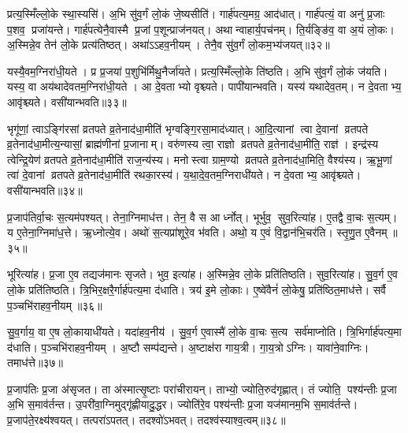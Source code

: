 प्रत्य॒स्मिँल्लो॒के स्था॒स्यसि॑।
अ॒भि सु॑व॒र्गं लो॒कं जे॒ष्यसीति॑।
गार्\mbox{}ह॑पत्य॒मग्र॒ आद॑धात्।
गार्\mbox{}ह॑पत्यं॒ वा अनु॑ प्र॒जाः प॒शव॒ प्रजा॑यन्ते।
गार्\mbox{}ह॑पत्येनै॒वास्मै प्र॒जां प॒शून्प्राज॑नयत्।
अथान्वाहार्य॒पच॑नम्।
ति॒र्यङ्ङि॑व॒ वा अ॒यं लो॒कः।
अ॒स्मिन्ने॒व तेन॑ लो॒के प्रत्य॑तिष्ठत्।
अथा॑ऽऽहव॒नीयम्।
तेनै॒व सु॑व॒र्गं लो॒कम॒भ्य॑जयत्॥३२॥

यस्यै॒वम॒ग्निरा॑धी॒यते।
प्र प्र॒जया॑ प॒शुभि॑र्मिथु॒नैर्जा॑यते।
प्रत्य॒स्मिँल्लो॒के ति॑ष्ठति।
अ॒भि सु॑व॒र्गं लो॒कं ज॑यति।
यस्य॒ वा अय॑थादेवतम॒ग्निरा॑धी॒यते।
आ दे॒वताभ्यो वृश्च्यते।
पापी॑यान्भवति।
यस्य॑ यथादेव॒तम्।
न दे॒वताभ्य॒ आवृ॑श्च्यते।
वसी॑यान्भवति॥३३॥

भृगू॑णां॒ त्वाऽङ्गि॑रसां व्रतपते व्र॒तेनाद॑धा॒मीति॑ भृग्वङ्गि॒रसा॒माद॑ध्यात्।
आ॒दि॒त्यानां त्वा दे॒वानां व्रतपते व्र॒तेनाद॑धा॒मीत्य॒न्यासां॒ ब्राह्म॑णीनां प्र॒जानाम्।
वरु॑णस्य त्वा॒ राज्ञो व्रतपते व्र॒तेनाद॑धा॒मीति॒ राज्ञ॑।
इन्द्र॑स्य त्वेन्द्रि॒येण॑ व्रतपते व्र॒तेनाद॑धा॒मीति॑ राज॒न्य॑स्य।
मनोस्त्वा ग्राम॒ण्यो व्रतपते व्र॒तेनाद॑धा॒मिति॒ वैश्य॑स्य।
ऋ॒भू॒णां त्वा॑ दे॒वानां व्रतपते व्र॒तेनाद॑धा॒मीति॑ रथका॒रस्य॑।
य॒था॒दे॒व॒तम॒ग्निराधी॑यते।
न दे॒वताभ्य॒ आवृ॑श्च्यते।
वसी॑यान्भवति॥३४॥

प्र॒जाप॑तिर्वा॒चः स॒त्यम॑पश्यत्।
तेना॒ग्निमाध॑त्त।
तेन॒ वै स आर्ध्नोत्।
भूर्भुव॒ सुव॒रित्या॑ह।
ए॒तद्वै वा॒चः स॒त्यम्।
य ए॒तेना॒ग्निमा॑ध॒त्ते।
ऋ॒ध्नोत्ये॒व।
अथो॑ स॒त्यप्रा॑शूरे॒व भ॑वति।
अथो॒ य ए॒वं वि॒द्वान॑भि॒चर॑ति।
स्तृ॒णु॒त ए॒वैनम्॥३५॥

भूरित्या॑ह।
प्र॒जा ए॒व तद्यज॑मानः सृजते।
भुव॒ इत्या॑ह।
अ॒स्मिन्ने॒व लो॒के प्रति॑तिष्ठति।
सुव॒रित्या॑ह।
सु॒व॒र्ग ए॒व लो॒के प्रति॑तिष्ठति।
त्रि॒भिर॒क्षरै॒र्गार्\mbox{}ह॑पत्य॒मा द॑धाति।
त्रय॑ इ॒मे लो॒काः।
ए॒ष्वे॑वैनं॑ लो॒केषु॒ प्रति॑ष्ठित॒माध॑त्ते।
सर्वै प॒ञ्चभि॑राहव॒नीयम्॥३६॥

सु॒व॒र्गाय॒ वा ए॒ष लो॒कायाधी॑यते।
यदा॑हव॒नीय॑।
सु॒व॒र्ग ए॒वास्मै॑ लो॒के वा॒चः स॒त्य सर्व॑माप्नोति।
त्रि॒भिर्गार्\mbox{}ह॑पत्य॒मा द॑धाति।
प॒ञ्चभि॑राहव॒नीयम्।
अ॒ष्टौ सम्प॑द्यन्ते।
अ॒ष्टाक्ष॑रा गाय॒त्री।
गा॒य॒त्रोऽग्निः।
यावा॑ने॒वाग्निः।
तमाध॑त्ते॥३७॥

प्र॒जाप॑तिः प्र॒जा अ॑सृजत।
ता अ॑स्मात्सृ॒ष्टाः परा॑चीरायन्।
ताभ्यो॒ ज्योति॒रुद॑गृह्णात्।
तं ज्योति॒ पश्य॑न्तीः प्र॒जा अ॒भि स॒माव॑र्तन्त।
उ॒परी॑वा॒ग्निमुद्गृ॑ह्णीयादु॒द्धर\sn{}।
ज्योति॑रे॒व पश्य॑न्तीः प्र॒जा यज॑मानम॒भि स॒माव॑र्तन्ते।
प्र॒जाप॑ते॒रक्ष्य॑श्वयत्।
तत्परा॑ऽपतत्।
तदश्वो॑ऽभवत्।
तदश्व॑स्याश्व॒त्वम्॥३८॥


